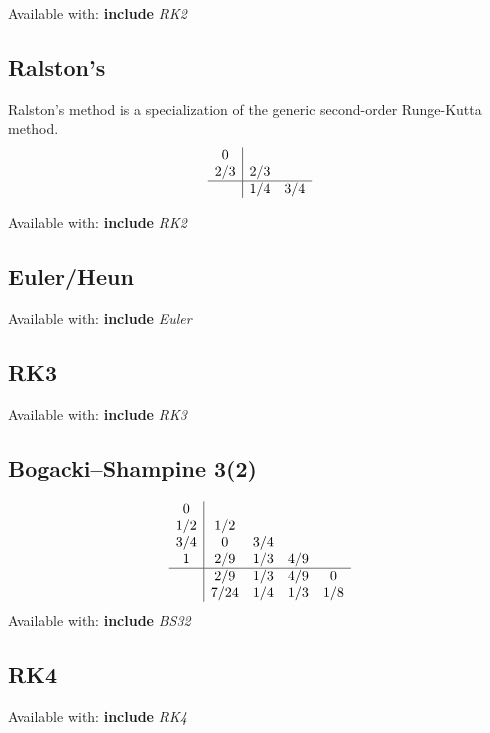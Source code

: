 \documentclass[letterpaper,10pt]{book}
\newcommand{\srcas}[1]{Available with: \textbf{include} \textlangle{}\textit{#1}\textrangle{}}
\begin{document}
	\srcas{RK2}
	
      \subsection{Ralston's}
	Ralston's method is a specialization of the generic second-order Runge-Kutta method.      
	\[
	  \begin{array}{c|cc}
	    0 & & \\
	    2/3 & 2/3 & \\
	    \hline
	    & 1/4 & 3/4
	  \end{array}
	\]      

	\srcas{RK2}

      \subsection{Euler/Heun}
    
    	\srcas{Euler}

      \subsection{RK3}
	\srcas{RK3}
    
    
      \subsection{Bogacki–Shampine 3(2)}
	\[
	  \begin{array}{c|cccc}
	    0 & & & &\\
	    1/2 & 1/2 & & &\\
	    3/4 & 0 & 3/4 & &\\	    
	    1 & 2/9 & 1/3 & 4/9 &\\	    
	    \hline
	    & 2/9 & 1/3 & 4/9 & 0\\
	    & 7/24 & 1/4 & 1/3 & 1/8\\
	  \end{array}
	\]    
    	\srcas{BS32}

    
      \subsection{RK4}
    	\srcas{RK4}

    
\end{document}
